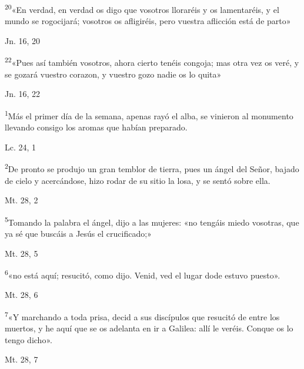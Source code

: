 \documentclass[a4paper,11pt]{article}
\begin{document}
      \textsuperscript{20}«En verdad, en verdad os digo que vosotros lloraréis y os lamentaréis, y el mundo se rogocijará;
      vosotros os afligiréis, pero vuestra aflicción está de parto»
      \begin{flushright}
        Jn. 16, 20        
      \end{flushright}

      \textsuperscript{22}«Pues así también vosotros, ahora cierto tenéis congoja; mas otra vez os veré, y se gozará vuestro corazon,
      y vuestro gozo nadie os lo quita»
      \begin{flushright}
        Jn. 16, 22       
      \end{flushright}

      \textsuperscript{1}Más el primer día de la semana, apenas rayó el alba, se vinieron al monumento llevando consigo los aromas
      que habían preparado.
      \begin{flushright}
        Lc. 24, 1        
      \end{flushright}

      \textsuperscript{2}De pronto se produjo un gran temblor de tierra, pues un ángel del Señor, bajado de cielo y acercándose, hizo rodar
      de su sitio la losa, y se sentó sobre ella.
      \begin{flushright}
        Mt. 28, 2        
      \end{flushright}      
      
      \textsuperscript{5}Tomando la palabra el ángel, dijo a las mujeres: «no tengáis miedo vosotras, que ya sé que buscáis a Jesús el crucificado;»
      \begin{flushright}
        Mt. 28, 5        
      \end{flushright}

      \textsuperscript{6}«no está aquí; resucitó, como dijo. Venid, ved el lugar dode estuvo puesto».
      \begin{flushright}
        Mt. 28, 6       
      \end{flushright}

      \textsuperscript{7}«Y marchando a toda prisa, decid a sus discípulos que resucitó de entre los muertos, y he aquí que se os adelanta en ir a Galilea:
      allí le veréis. Conque os lo tengo dicho».
      \begin{flushright}
        Mt. 28, 7     
      \end{flushright}
\end{document}
